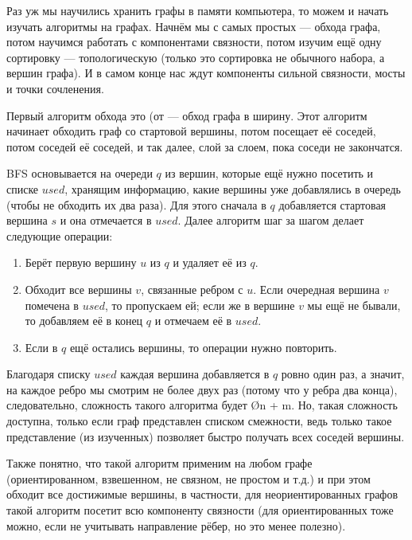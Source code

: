 Раз уж мы научились хранить графы в памяти компьютера, то можем и начать изучать алгоритмы на графах. Начнём мы с самых простых — обхода графа, потом научимся работать с компонентами связности, потом изучим ещё одну сортировку — топологическую (только это сортировка не обычного набора, а вершин графа). И в самом конце нас ждут компоненты сильной связности, мосты и точки сочленения.


Первый алгоритм обхода это  (от  — обход графа в ширину. Этот алгоритм начинает обходить граф со стартовой вершины, потом посещает её соседей, потом соседей её соседей, и так далее, слой за слоем, пока соседи не закончатся. 

BFS основывается на очереди $q$ из вершин, которые ещё нужно посетить и списке $used$, хранящим информацию, какие вершины уже добавлялись в очередь (чтобы не обходить их два раза). Для этого сначала в $q$ добавляется стартовая вершина $s$ и она отмечается в $used$. Далее алгоритм шаг за шагом делает следующие операции:

\begin{box-algo}
    \begin{enumerate}
        \item Берёт первую вершину $u$ из $q$ и удаляет её из $q$.
        \item Обходит все вершины $v$, связанные ребром с $u$. Если очередная вершина $v$ помечена в $used$, то пропускаем ей; если же в вершине $v$ мы ещё не бывали, то добавляем её в конец $q$ и отмечаем её в $used$.
        \item Если в $q$ ещё остались вершины, то операции нужно повторить.
    \end{enumerate}
\end{box-algo}

Благодаря списку $used$ каждая вершина добавляется в $q$ ровно один раз, а значит, на каждое ребро мы смотрим не более двух раз (потому что у ребра два конца), следовательно, сложность такого алгоритма будет \O{n + m}. Но, такая сложность доступна, только если граф представлен списком смежности, ведь только такое представление (из изученных) позволяет быстро получать всех соседей вершины.

Также понятно, что такой алгоритм применим на любом графе (ориентированном, взвешенном, не связном, не простом и т.д.) и при этом обходит все достижимые вершины, в частности, для неориентированных графов такой алгоритм посетит всю компоненту связности (для ориентированных тоже можно, если не учитывать направление рёбер, но это менее полезно).



